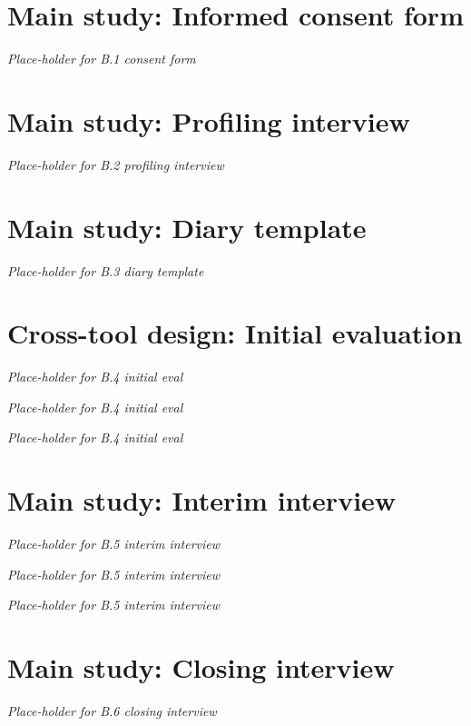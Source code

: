 \newpage
\section{Main study: Informed consent form}
\label{chap:appendices-main-study-material:consent}
\Huge
\textit{Place-holder for B.1 consent form}
\normalsize

\newpage
\section{Main study: Profiling interview}
\label{chap:appendices-main-study-material:profile}
\Huge
\textit{Place-holder for B.2 profiling interview}
\normalsize

\newpage
\section{Main study: Diary template}
\label{chap:appendices-main-study-material:diary}
\Huge
\textit{Place-holder for B.3 diary template}
\normalsize

\newpage
\section{Cross-tool design: Initial evaluation}
\label{chap:appendices-main-study-material:initial}
\Huge
\textit{Place-holder for B.4 initial eval}
\normalsize

\newpage
\Huge
\textit{Place-holder for B.4 initial eval}
\normalsize

\newpage
\Huge
\textit{Place-holder for B.4 initial eval}
\normalsize

\newpage
\section{Main study: Interim interview}
\label{chap:appendices-main-study-material:interim}
\Huge
\textit{Place-holder for B.5 interim interview}
\normalsize

\newpage
\Huge
\textit{Place-holder for B.5 interim interview}
\normalsize

\newpage
\Huge
\textit{Place-holder for B.5 interim interview}
\normalsize

\newpage
\section{Main study: Closing interview}
\label{chap:appendices-main-study-material:closing}
\Huge
\textit{Place-holder for B.6 closing interview}
\normalsize

